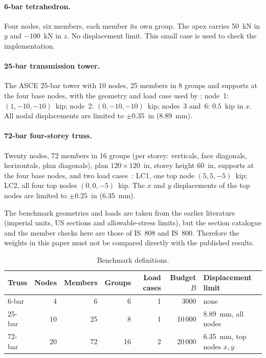 \documentclass[lineno,pdflatex,sn-mathphys-num]{sn-jnl}
\begin{document}
\paragraph{6-bar tetrahedron.} Four nodes, six members, each member its own
group. The apex carries 50~kN in $y$ and $-100$~kN in $z$. No displacement
limit. This small case is used to check the implementation.

\paragraph{25-bar transmission tower.} The ASCE 25-bar tower with 10 nodes,
25 members in 8 groups and supports at the four base nodes, with the geometry
and load case used by \citet{Camp2004}: node~1: $(1,-10,-10)$~kip; node~2:
$(0,-10,-10)$~kip; nodes~3 and~6: $0.5$~kip in $x$. All nodal displacements are
limited to $\pm0.35$~in (8.89~mm).

\paragraph{72-bar four-storey truss.} Twenty nodes, 72 members in 16 groups
(per storey: verticals, face diagonals, horizontals, plan diagonals), plan
$120\times120$~in, storey height 60~in, supports at the four base nodes, and
two load cases~\citep{Camp2007}: LC1, one top node $(5,5,-5)$~kip; LC2, all
four top nodes $(0,0,-5)$~kip. The $x$ and $y$ displacements of the top nodes
are limited to $\pm0.25$~in (6.35~mm).

The benchmark geometries and loads are taken from the earlier literature
(imperial units, US sections and allowable-stress limits), but the section
catalogue and the member checks here are those of IS~808 and IS~800.
Therefore the weights in this paper must not be compared directly with the
published results.

\begin{table}[tbp]
\centering\small
\caption{Benchmark definitions.}
\label{tab:bench}
\begin{tabular}{@{}lrrrrrl@{}}
\toprule
Truss & Nodes & Members & Groups & Load cases & Budget $B$ & Displacement limit\\
\midrule
6-bar  & 4  & 6  & 6  & 1 & 3000   & none\\
25-bar & 10 & 25 & 8  & 1 & 10\,000 & 8.89~mm, all nodes\\
72-bar & 20 & 72 & 16 & 2 & 20\,000 & 6.35~mm, top nodes $x,y$\\
\bottomrule
\end{tabular}
\end{table}
\end{document}
